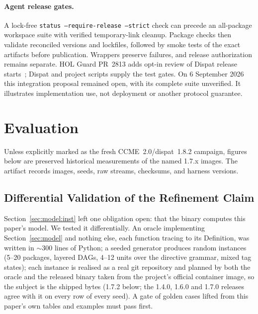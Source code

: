 \documentclass[sigconf,nonacm]{acmart}
\newcommand{\code}[1]{\texttt{#1}}
\begin{document}
\paragraph{Agent release gates.}
A lock-free \code{status --require-release --strict} check can precede
an all-package workspace suite with verified temporary-link cleanup.
Package checks then validate reconciled versions and lockfiles, followed by
smoke tests of the exact artifacts before publication. Wrappers preserve
failures, and release authorization remains separate.
HOL Guard PR~2813 adds opt-in review of Dispat release starts~\cite{guard};
Dispat and project scripts supply the test gates. On 6 September 2026 this
integration proposal remained open, with its complete suite unverified.
It illustrates implementation use, not deployment or another protocol guarantee.

\section{Evaluation}
\label{sec:eval}

Unless explicitly marked as the fresh CCME~2.0/dispat~1.8.2 campaign, figures
below are preserved historical measurements of the named 1.7.x images. The
artifact records images, seeds, raw streams, checksums, and harness versions.

\subsection{Differential Validation of the Refinement Claim}
\label{sec:eval:diff}

Section~\ref{sec:model:inst} left one obligation open: that the binary
computes this paper's model. We tested it differentially. An oracle
implementing Section~\ref{sec:model} and nothing else, each function
tracing to its Definition, was written in $\sim$300 lines of Python;
a seeded generator produces random instances (5--20 packages, layered
DAGs, 4--12 units over the directive grammar, mixed tag states); each
instance is realised as a real git repository and planned by both the
oracle and the released binary taken from the project's official
container image, so the subject is the shipped bytes (1.7.2 below; the
1.4.0, 1.6.0 and 1.7.0 releases agree with it on every row of every seed). A
gate of golden cases lifted from this paper's own tables and examples
must pass first.
\end{document}
